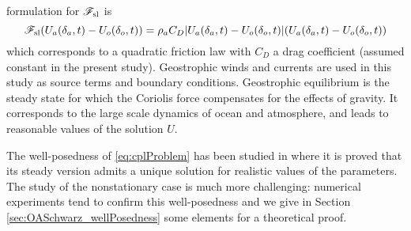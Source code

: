 formulation for ${\cal F}_{\rm sl}$ is
\[
{\cal F}_{\rm sl}( U_a(\delta_a,t)-U_o(\delta_o,t) ) = 
\rho_a C_D | U_a(\delta_a,t)-U_o(\delta_o,t) | (U_a(\delta_a,t)-U_o(\delta_o,t))
\]
which corresponds to a quadratic friction law with $C_D$ 
a drag coefficient (assumed constant in the present study).
%
%
Geostrophic winds and currents are used in this study as
source terms and boundary conditions. 
Geostrophic equilibrium is the steady state for which the 
Coriolis force compensates for the effects of gravity.
It corresponds to the large scale dynamics of ocean and 
atmosphere, and leads to reasonable values of the solution $U$. \par
The well-posedness of \eqref{eq:cplProblem} has been studied in 
\cite{thery_etude_2021}
where it is proved that its steady version admits a unique
solution for realistic values of the parameters. The study of the
nonstationary case is much more challenging: numerical experiments
tend to confirm this well-posedness and we give in Section
\ref{sec:OASchwarz_wellPosedness} some elements for a theoretical proof.
%
%
%
%
%
%
%
%
%
% 
%
%

